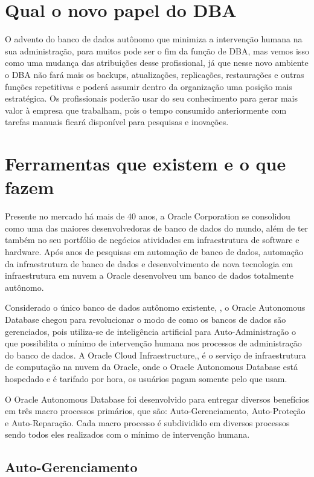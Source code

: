 \section{Qual o novo papel do DBA}

O advento do banco de dados autônomo que minimiza a intervenção humana na sua administração, para muitos pode ser o fim da função de DBA, mas vemos isso como uma mudança das atribuições desse profissional, já que nesse novo ambiente o DBA não fará mais os backups, atualizações, replicações, restaurações e outras funções repetitivas e poderá assumir dentro da organização uma posição mais estratégica. Os profissionais poderão usar do seu conhecimento para gerar mais valor à empresa que trabalham, pois o tempo consumido anteriormente com tarefas manuais ficará disponível para pesquisas e inovações.


\section{Ferramentas que existem e o que fazem}

Presente no mercado há mais de 40 anos, a Oracle Corporation se consolidou como uma das maiores desenvolvedoras de banco de dados do mundo, além de ter também no seu portfólio de negócios atividades em infraestrutura de software e hardware.  Após anos de pesquisas em automação de banco de dados, automação da infraestrutura de banco de dados e desenvolvimento de nova tecnologia em infraestrutura em nuvem a Oracle desenvolveu um banco de dados totalmente autônomo.

Considerado o único banco de dados autônomo existente, \cite{Auricchio}, o Oracle Autonomous Database chegou para revolucionar o modo de como os bancos de dados são gerenciados, pois utiliza-se de inteligência artificial para Auto-Administração o que possibilita o mínimo de intervenção humana nos processos de administração do banco de dados. A Oracle Cloud Infraestructure,\cite{OCI}, é o serviço de infraestrutura de computação na nuvem da Oracle, onde o Oracle Autonomous Database está hospedado e é tarifado por hora, os usuários pagam somente pelo que usam.

O Oracle Autonomous Database foi desenvolvido para entregar diversos benefícios em três macro processos primários, que são: Auto-Gerenciamento, Auto-Proteção e Auto-Reparação. Cada macro processo é subdividido em diversos processos sendo todos eles realizados com o mínimo de intervenção humana.


\subsection{Auto-Gerenciamento}

